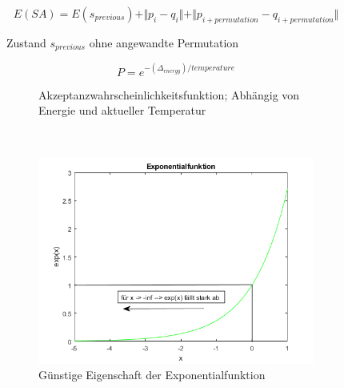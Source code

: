 \begin{figure}[H]
  \[ E(SA) = E(s_{previous}) + \Vert{p_{i}-q_{i}}\Vert + \Vert{p_{i 
        + permutation}-q_{i + permutation}}\Vert\]
  \caption{Zustand $s_{previous}$ ohne angewandte Permutation}
  \label{eq:vereinfachte pixel energy function}
\end{figure}


\begin{figure}[H]
    \centering
    \begin{subfigure}[b]{0.4\textwidth}
        \begin{equation}\label{eq:Akzeptanzwahrscheinlichkeitsfunktion}
            P = e^{-(\Delta_{energy})/ temperature}
        \end{equation}
        \caption{Akzeptanzwahrscheinlichkeitsfunktion; Abhängig von Energie und aktueller Temperatur}
    \end{subfigure}
    ~ %
    \begin{subfigure}[b]{0.7\textwidth}
        \centering \includegraphics[interpolate=false,width=\linewidth]{content/simulatedAnnealing/Bilder/exponentialfunktion_as_PDF.png}
        \caption{Günstige Eigenschaft der Exponentialfunktion}
        \label{fig:Exponentialfunktion}
    \end{subfigure}
    \caption{}
\end{figure}

